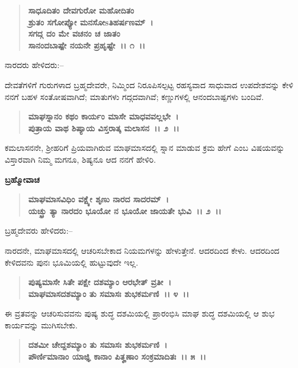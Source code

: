 \begin{verse}
\textbf{ಸಾಧೂದಿತಂ ದೇವಗುರೋ ಮಹೋದಿತಂ}\\\textbf{ಶ್ರುತಂ ಸಗೋಪ್ಯೋ ಮನಸೋsತಿಹರ್ಷಣಮ್~।}\\\textbf{ಸಗದ್ಗ ದಂ ಮೇ ವಚನಂ ಚ ಜಾತಂ}\\\textbf{ಸಾನಂದಬಾಷ್ಪೇ ನಯನೇ ಪ್ರಹೃಷ್ಟೇ~।। ೧~।।}
\end{verse}

\begin{flushleft}
ನಾರದರು ಹೇಳಿದರು:–
\end{flushleft}

ದೇವತೆಗಳಿಗೆ ಗುರುಗಳಾದ ಬ್ರಹ್ಮದೇವರೇ, ನಿಮ್ಮಿಂದ ನಿರೂಪಿಸಲ್ಪಟ್ಟ ರಹಸ್ಯವಾದ ಸಾಧುವಾದ ಉಪದೇಶವನ್ನು ಕೇಳಿ ನನಗೆ ಬಹಳ ಸಂತೋಷವಾಗಿದೆ; ಮಾತುಗಳು ಗದ್ಗದವಾಗಿವೆ; ಕಣ್ಣುಗಳಲ್ಲಿ ಆನಂದಬಾಷ್ಪಗಳು ಬಂದಿವೆ.

\begin{verse}
\textbf{ಮಾಘಸ್ನಾನಂ ಕಥಂ ಕಾರ್ಯಂ ಮಾಸೇ ಮಾಧವವಲ್ಲಭೇ~।}\\\textbf{ಪುತ್ರಾಯ ವಾಥ ಶಿಷ್ಯಾಯ ವಿಸ್ತರಾತ್ಕ ಮಲಾಸನ~।। ೨~।।}
\end{verse}

ಕಮಲಾಸನನೇ, ಶ‍್ರೀಹರಿಗೆ ಪ್ರಿಯವಾಗಿರುವ ಮಾಘಮಾಸದಲ್ಲಿ ಸ್ನಾನ ಮಾಡುವ ಕ್ರಮ ಹೇಗೆ ಎಂಬ ವಿಷಯವನ್ನು ವಿಸ್ತಾರವಾಗಿ ನಿಮ್ಮ ಮಗನೂ, ಶಿಷ್ಯನೂ ಆದ ನನಗೆ ಹೇಳಿರಿ.

\begin{flushleft}
\textbf{ಬ್ರಹ್ಮೋವಾಚ }
\end{flushleft}

\begin{verse}
\textbf{ಮಾಘಮಾಸವಿಧಿಂ ವಕ್ಷ್ಯೇ ಶೃಣು ನಾರದ ಸಾದರಮ್~।}\\\textbf{ಯಚ್ಛ್ರು ತ್ಯಾ ನಾರದಂ ಭೂಯೋ ನ ಭೂಯೋ ಜಾಯತೇ ಭುವಿ~।। ೨~।।}
\end{verse}

\begin{flushleft}
ಬ್ರಹ್ಮದೇವರು ಹೇಳಿದರು:–
\end{flushleft}

ನಾರದನೇ, ಮಾಘಮಾಸದಲ್ಲಿ ಆಚರಿಸಬೇಕಾದ ನಿಯಮಗಳನ್ನು ಹೇಳುತ್ತೇನೆ. ಆದರದಿಂದ ಕೇಳು. ಆದರದಿಂದ ಕೇಳಿದವನು ಪುನಃ ಭೂಮಿಯಲ್ಲಿ ಹುಟ್ಟುವುದೇ ಇಲ್ಲ.

\begin{verse}
\textbf{ಪುಷ್ಯಮಾಸೇ ಸಿತೇ ಪಕ್ಷೇ ದಶಮ್ಯಾಂ ಆರಭೇತ್ ವ್ರತೀ~।}\\\textbf{ಮಾಘಮಾಸದಶಮ್ಯಾಂ ತು ಸಮಾಸಃ ಶುಭಕರ್ಮಣಿ~।। ೪~।।}
\end{verse}

ಈ ವ್ರತವನ್ನು ಆಚರಿಸುವವನು ಪುಷ್ಯ ಶುದ್ಧ ದಶಮಿಯಲ್ಲಿ ಪ್ರಾರಂಭಿಸಿ ಮಾಘ ಶುದ್ಧ ದಶಮಿಯಲ್ಲಿ ಆ ಶುಭ ಕಾರ್ಯವನ್ನು ಮುಗಿಸಬೇಕು.

\begin{verse}
\textbf{ದಶಮೀ ಚೇದ್ದಶಮ್ಯಾಂ ತು ಸಮಾಸಃ ಶುಭಕರ್ಮಣಿ~।}\\\textbf{ಪೌರ್ಣಿಮಾನಾಂ ಯಾಜ್ಞಿ ಕಾನಾಂ ಪಿತೄಣಾಂ ಸಂಕ್ರಮಾದಿತಃ~।। ೫~।।}
\end{verse}

